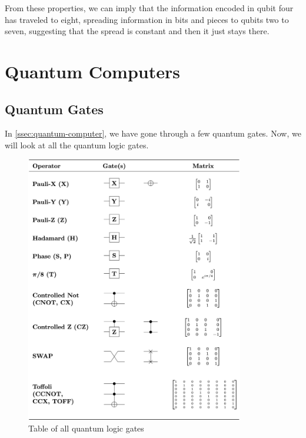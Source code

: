 \documentclass[11pt, oneside, listof=totoc]{scrbook}
\begin{document}
From these properties, we can imply that the information encoded in qubit four has traveled to eight, spreading information in bits and pieces to qubits two to seven, suggesting that the spread is constant and then it just stays there.


\appendix

\chapter{Quantum Computers}

\section{Quantum Gates}

In \cref{ssec:quantum-computer}, we have gone through a few quantum gates. Now, we will look at all the quantum logic gates.
\begin{figure}[H]
    \centering
    \includegraphics[width=0.85\textwidth]{Quantum_Logic_Gates.png}
    \caption[Table of all quantum logic gates]{Table of all quantum logic gates\protect\footnotemark}
    \label{fig:quantum-logic-gates}
\end{figure}
\end{document}

